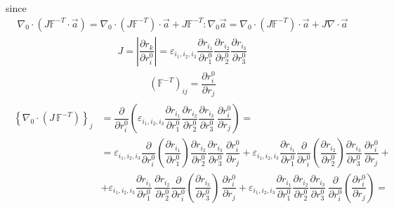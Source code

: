 \documentclass[letterpaper,10pt,english]{jupyterBook}
\begin{document}
\sphinxAtStartPar
since
\begin{equation*}
\begin{split}
\nabla_0 \cdot \left( J \mathbb{F}^{-T} \cdot \vec{a} \right) 
= \nabla_0 \cdot \left( J \mathbb{F}^{-T} \right) \cdot \vec{a}
+ J \mathbb{F}^{-T} : \nabla_0 \vec{a} = 
 \nabla_0 \cdot \left( J \mathbb{F}^{-T} \right) \cdot \vec{a} + J \nabla \cdot \vec{a}
\end{split}
\end{equation*}
\sphinxAtStartPar
{}
\begin{equation*}
\begin{split}J = \left| \dfrac{\partial r_k}{\partial r^0_i} \right| = \varepsilon_{i_1, i_2, i_3} \dfrac{\partial r_{i_1}}{\partial r^0_1} \dfrac{\partial r_{i_2}}{\partial r^0_2} \dfrac{\partial r_{i_3}}{\partial r^0_3}\end{split}
\end{equation*}\begin{equation*}
\begin{split}\left( \mathbb{F}^{-T} \right)_{ij} = \dfrac{\partial r^0_i}{\partial r_j}\end{split}
\end{equation*}\begin{equation*}
\begin{split}\begin{aligned}
\left\{ \nabla_0 \cdot \left( J \, \mathbb{F}^{-T} \right) \right\}_j
 & = \dfrac{\partial }{\partial r_i^0} \left(  \varepsilon_{i_1, i_2, i_3} \dfrac{\partial r_{i_1}}{\partial r^0_1} \dfrac{\partial r_{i_2}}{\partial r^0_2} \dfrac{\partial r_{i_3}}{\partial r^0_3} \,  \dfrac{\partial r^0_i}{\partial r_j}\right) = \\
 & = \varepsilon_{i_1, i_2, i_3} \dfrac{\partial }{\partial r_i^0} \left(\dfrac{\partial r_{i_1}}{\partial r^0_1} \right)\dfrac{\partial r_{i_2}}{\partial r^0_2} \dfrac{\partial r_{i_3}}{\partial r^0_3} \,  \dfrac{\partial r^0_i}{\partial r_j} 
   + \varepsilon_{i_1, i_2, i_3} \dfrac{\partial r_{i_1}}{\partial r^0_1}  \dfrac{\partial }{\partial r_i^0} \left( \dfrac{\partial r_{i_2}}{\partial r^0_2} \right) \dfrac{\partial r_{i_3}}{\partial r^0_3} \,  \dfrac{\partial r^0_i}{\partial r_j} + \\
 & + \varepsilon_{i_1, i_2, i_3} \dfrac{\partial r_{i_1}}{\partial r^0_1} \, \dfrac{\partial r_{i_2}}{\partial r^0_2} \dfrac{\partial }{\partial r_i^0} \left(\dfrac{\partial r_{i_3}}{\partial r^0_3}\right) \,  \dfrac{\partial r^0_i}{\partial r_j} 
   + \varepsilon_{i_1, i_2, i_3}\dfrac{\partial r_{i_1}}{\partial r^0_1} \dfrac{\partial r_{i_2}}{\partial r^0_2} \dfrac{\partial r_{i_3}}{\partial r^0_3} \, \dfrac{\partial }{\partial r_i^0} \left(  \dfrac{\partial r^0_i}{\partial r_j} \right) = \\

\end{aligned}
\end{split}
\end{equation*}
\end{document}
